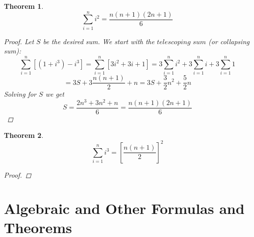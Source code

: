 \documentclass[10pt]{report}
\newtheorem{thm2}{Theorem}[section]
\begin{document}
\begin{thm2}
$$\sum_{i=1}^n i^2=\frac{n(n+1)(2n+1)}{6}$$
\begin{proof}
Let $S$ be the desired sum. We start with the $\textit{telescoping sum}$ (or collapsing sum):
$$\sum_{i=1}^n[(1+i^3)-i^3]=\sum_{i=1}^n[3i^2+3i+1]=3\sum_{i=1}^n i^2+3\sum_{i=1}^n i+3\sum_{i=1}^n 1$$
$$=3S+3\frac{n(n+1)}{2}+n=3S+\frac{3}{2}n^2+\frac{5}{2}n$$
Solving for $S$ we get
$$S=\frac{2n^3+3n^2+n}{6}= \frac{n(n+1)(2n+1)}{6}$$
\end{proof}
\end{thm2}
\begin{thm2}
$$\sum_{i=1}^n i^3=\left[\frac{n(n+1)}{2}\right]^2$$
\begin{proof}

\end{proof}
\end{thm2}

\chapter{Algebraic and Other Formulas and Theorems}
\end{document}
